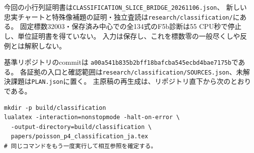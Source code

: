 \documentclass[a4paper,11pt]{ltjsarticle}
\theoremstyle{definition}
\begin{document}
今回の小行列証明書は\texttt{CLASSIFICATION\_SLICE\_BRIDGE\_20261106.json}、
新しい忠実チャートと特殊像補題の証明・独立査読は\texttt{research/classification/}にある。
固定標数32003・保存済み中心での全134式のF5b診断は55 CPU秒で停止し、単位証明書を得ていない。
入力は保存し、これを標数零の一般尽くしや反例とは解釈しない。

基準リポジトリのcommitは
\texttt{a00a541b835b2bff18bafcba545ecbd4bae7175b}である。
各証拠の入口と確認範囲は\texttt{research/classification/SOURCES.json}、未解決課題は\texttt{PLAN.json}に置く。
主原稿の再生成は、リポジトリ直下から次のとおりである。
\begin{verbatim}
mkdir -p build/classification
lualatex -interaction=nonstopmode -halt-on-error \
  -output-directory=build/classification \
  papers/poisson_p4_classification_ja.tex
# 同じコマンドをもう一度実行して相互参照を確定する。
\end{verbatim}
\end{document}
